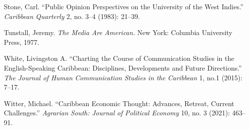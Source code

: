 \documentclass{tufte-handout}
\begin{document}
\begin{hangparas}{.25in}{1}
Stone, Carl. ``Public Opinion Perspectives on the University of the West
Indies.'' \emph{Caribbean Quarterly} 2, no. 3--4 (1983): 21--39.

Tunstall, Jeremy. \emph{The Media Are American.} New York: Columbia
University Press, 1977.

White, Livingston A. ``Charting the Course of Communication Studies in
the English-Speaking Caribbean: Disciplines, Developments and Future
Directions.'' \emph{The Journal of Human Communication Studies in the
Caribbean} 1, no.1 (2015): 7--17.

Witter, Michael. ``Caribbean Economic Thought: Advances, Retreat,
Current Challenges.'' \emph{Agrarian South: Journal of Political
Economy} 10, no. 3 (2021): 463--91.



\end{hangparas}
\end{document}
